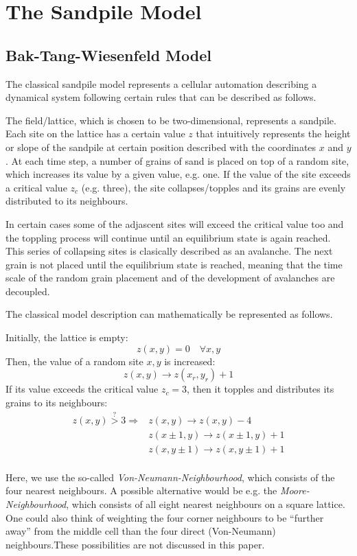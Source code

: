 \chapter{The Sandpile Model}
\thispagestyle{fancy}

\section{Bak-Tang-Wiesenfeld Model}

The classical sandpile model represents a cellular automation describing a dynamical system following certain rules that can be described as follows.

The field/lattice, which is chosen to be two-dimensional, represents a sandpile. Each site on the lattice has a certain value $z$ that intuitively represents the height or slope of the sandpile at certain position described with the coordinates $x$ and $y$. At each time step, a number of grains of sand is placed on top of a random site, which increases its value by a given value, e.g. one. If the value of the site exceeds a critical value $z_c$ (e.g. three), the site collapses/topples and its grains are evenly distributed to its neighbours.

In certain cases some of the adjascent sites will exceed the critical value too and the toppling process will continue until an equilibrium state is again reached. This series of collapsing sites is clasically described as an avalanche. The next grain is not placed until the equilibrium state is reached, meaning that the time scale of the random grain placement and of the development of avalanches are decoupled.

The classical model description can mathematically be represented as follows.

Initially, the lattice is empty:
\[
z(x,y) = 0 \quad\forall x, y
\]
Then, the value of a random site $x,y$ is increased:
\[
z(x,y) \to z(x_r,y_r) + 1
\]
If its value exceeds the critical value $z_c=3$, then it topples and distributes its grains to its neighbours:
\[
\begin{aligned}
z(x,y) \overset{?}{>} 3 \Rightarrow & z(x,y) \to z(x,y)-4 \\
 & z(x\pm 1,y) \to z(x\pm 1,y)+1 \\
 & z(x,y\pm 1) \to z(x,y\pm 1)+1 \\
\end{aligned}
\]

Here, we use the so-called \emph{Von-Neumann-Neighbourhood}, which consists of the four nearest neighbours. A possible alternative would be e.g. the \emph{Moore-Neighbourhood}, which consists of all eight nearest neighbours on a square lattice. One could also think of weighting the four corner neighbours to be ``further away'' from the middle cell than the four direct (Von-Neumann) neighbours.These possibilities are not discussed in this paper.

